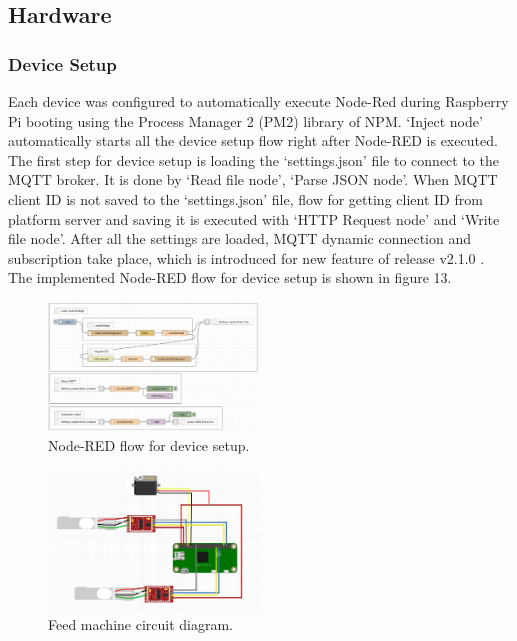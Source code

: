 \documentclass[conference]{IEEEtran}
\begin{document}
\subsection{Hardware}

\subsubsection{Device Setup}
Each device was configured to automatically execute Node-Red during Raspberry Pi booting using the Process Manager 2 (PM2) library of NPM. ‘Inject node’ automatically starts all the device setup flow right after Node-RED is executed. The first step for device setup is loading the ‘settings.json’ file to connect to the MQTT broker. It is done by ‘Read file node’, ‘Parse JSON node’. When MQTT client ID is not saved to the ‘settings.json’ file, flow for getting client ID from platform server and saving it is executed with ‘HTTP Request node’ and ‘Write file node’. After all the settings are loaded, MQTT dynamic connection and subscription take place, which is introduced for new feature of release v2.1.0 \cite{b26}. The implemented Node-RED flow for device setup is shown in figure 13.

\begin{figure}[htbp]
\centerline{\includegraphics[width=0.5\textwidth]{./images/deviceCommonNodeRED.png}}
\caption{Node-RED flow for device setup.}
\label{fig}
\end{figure}

\begin{figure}[htbp]
\centerline{\includegraphics[width=0.5\textwidth]{./images/feed machine circuit.jpg}}
\caption{Feed machine circuit diagram.}
\label{fig}
\end{figure}
\end{document}
